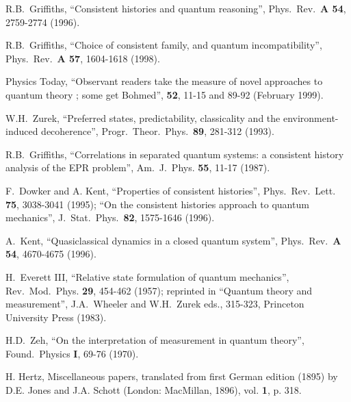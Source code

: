\documentclass[12pt,onecolumn]{article}%
\begin{document}
\begin{thebibliography}{999}
R.B.\ Griffiths, ``Consistent histories and quantum
reasoning'', Phys.\ Rev.\ \textbf{A 54}, 2759-2774 (1996).

R.B.\ Griffiths, ``Choice of consistent family, and
quantum incompatibility'', Phys.\ Rev.\ \textbf{A 57}, 1604-1618 (1998).

Physics Today, ``Observant readers take the measure of
novel approaches to quantum theory ; some get Bohmed'', \textbf{52}, 11-15 and
89-92 (February 1999).

W.H.\ Zurek, ``Preferred states, predictability, classicality
and the environment-induced decoherence'', Progr.\ Theor.\ Phys.\ \textbf{89},
281-312 (1993).

R.B.\ Griffiths, ``Correlations in separated quantum
systems: a consistent history analysis of the EPR problem'', Am.\ J.\ Phys.
\textbf{55}, 11-17 (1987).

F.\ Dowker and A. Kent, ``Properties of consistent
histories'', Phys.\ Rev.\ Lett. \textbf{75}, 3038-3041 (1995); ``On the
consistent histories approach to quantum mechanics'',
J.\ Stat.\ Phys.\ \textbf{82}, 1575-1646 (1996).

A.\ Kent, ``Quasiclassical dynamics in a closed quantum
system'', Phys.\ Rev.\ \textbf{A 54}, 4670-4675 (1996).

H.\ Everett III, ``Relative state formulation of quantum
mechanics'', Rev.\ Mod.\ Phys. \textbf{29}, 454-462 (1957); reprinted in
``Quantum theory and measurement'', J.A.\ Wheeler and W.H.\ Zurek eds.,
315-323, Princeton University Press (1983).

H.D.\ Zeh, ``On the interpretation of measurement in quantum
theory'', Found.\ Physics \textbf{I}, 69-76 (1970).

H. Hertz, Miscellaneous papers, translated from first German
edition (1895) by D.E. Jones and J.A. Schott (London: MacMillan, 1896), vol.
\textbf{1}, p. 318.
\end{thebibliography}
\end{document}
